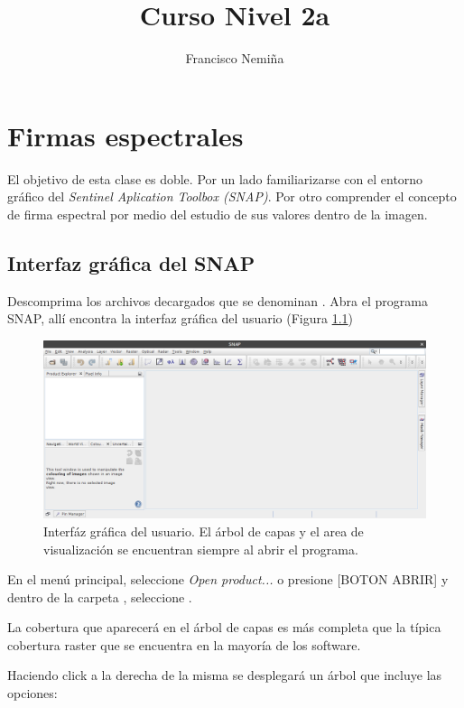 \documentclass[a4paper,10pt]{book}
\title{Curso Nivel 2a}
\author{Francisco Nemiña}
\begin{document}
\maketitle
\titlepage
\chapter{Firmas espectrales}
El objetivo de esta clase es doble. Por un lado familiarizarse con el entorno gráfico del \emph{Sentinel Aplication Toolbox (SNAP)}. Por otro comprender el concepto de firma espectral por medio del estudio de sus valores dentro de la imagen.

\section{Interfaz gráfica del SNAP}

Descomprima los archivos decargados que se denominan . Abra el programa SNAP, allí encontra la interfaz gráfica del usuario (Figura \ref{fig:int})

\begin{figure}[h!]
    \centering
    \includegraphics[scale=1.1]{fig:int.png}
    \caption{Interfáz gráfica del usuario. El árbol de capas y el area de visualización se encuentran siempre al abrir el programa.}
    \label{fig:int}
\end{figure}

En el menú principal, seleccione \emph{Open product...} o presione [BOTON ABRIR] y dentro de la carpeta , seleccione .

La cobertura que aparecerá en el árbol de capas es más completa que la típica cobertura raster que se encuentra en la mayoría de los software.

Haciendo click a la derecha de la misma se desplegará un árbol que incluye las opciones:
\end{document}
